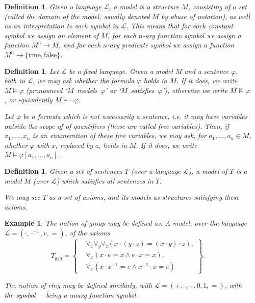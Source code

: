 \documentclass{article}
\newtheorem{example}[theorem]{Example}
\newtheorem{definition}[theorem]{Definition}
\theoremstyle{nonumberplain}
\newcommand{\Lang}{\mathcal{L}}
\begin{document}
\begin{definition}
Given a language $\Lang$, a \emph{model} is a structure $M$, consisting of a set (called the domain of the model, usually denoted $M$ by abuse of notation), as well as an interpretation to each symbol in $\Lang$. This means that for each constant symbol we assign an element of $M$, for each $n$-ary function symbol we assign a function $M^n \to M$, and for each $n$-ary predicate symbol we assign a function $M^n \to \{\text{true}, \text{false}\}$.
\end{definition}

\begin{definition}
Let $\Lang$ be a fixed language. Given a model $M$ and a sentence $\varphi$, both in $\Lang$, we may ask whether the formula $\varphi$ holds in $M$. If it does, we write $M \vDash \varphi$ (pronounced `$M$~models~$\varphi$' or `$M$~satisfies~$\varphi$'), otherwise we write $M \nvDash \varphi$, or equivalently $M \vDash \neg\varphi$.

Let $\varphi$ be a formula which is not necessarily a sentence, i.e. it may have variables outside the scope of of quantifiers (these are called free variables). Then, if $x_1, \dots, x_n$ is an enumeration of these free variables, we may ask, for $a_1, \dots, a_n \in M$, whether $\varphi$ with $x_i$ replaced by $a_i$ holds in $M$. If it does, we write $M \vDash \varphi[a_1, \dots, a_n]$.
\end{definition}

\begin{definition}
Given a set of sentences $T$ (over a language $\Lang$), a \emph{model of $T$} is a model $M$ (over $\Lang$) which satisfies all sentences in $T$.

We may see $T$ as a set of axioms, and its models as structures satisfying these axioms.
\end{definition}

\begin{example}\label{ex:1}
The notion of group may be defined as: A model, over the language $\Lang = (\cdot, \cdot^{-1}, e, =)$, of the axioms
\begin{equation}
T_{\text{grp}} = \left\{
\begin{aligned}
&\forall_x \forall_y \forall_z (x \cdot (y \cdot z) = (x \cdot y) \cdot z),\\
&\forall_x (x \cdot e = x \land e \cdot x = x),\\
&\forall_x (x \cdot x^{-1} = e \land x^{-1} \cdot x = e)
\end{aligned}\right\}.
\end{equation}

The notion of ring may be defined similarly, with $\Lang = (+,\cdot,-,0,1, =)$, with the symbol $-$ being a unary function symbol.
\end{example}
\end{document}
